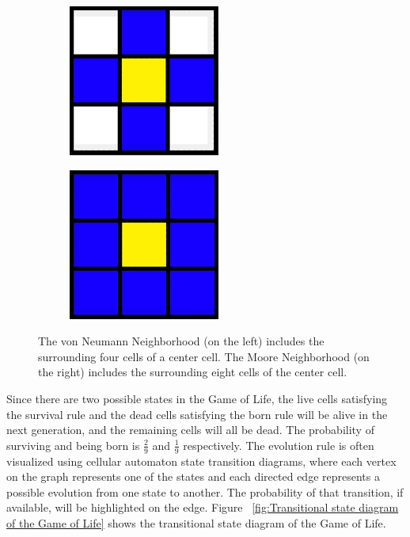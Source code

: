 \documentclass[12pt]{article}
\numberwithin{figure}{section} %
\begin{document}
\begin{figure}[H]
	\begin{subfigure}{0.48\textwidth}
     		\centering
     		\includegraphics[width=.6\linewidth]{Section1/1}
   	\end{subfigure}\hfill
   	\begin{subfigure}{0.48\textwidth}
     		\centering
     		\includegraphics[width=.6\linewidth]{Section1/2}
   	\end{subfigure}
   	\caption[Neighborhood configuration]{The von Neumann Neighborhood (on the left) includes the surrounding four cells of a center cell. The Moore Neighborhood (on the right) includes the surrounding eight cells of the center cell.}
   	\vspace{-1.5em}
   	\label{fig:Neighborhood configuration}
\end{figure}

Since there are two possible states in the Game of Life, the live cells satisfying the survival rule and the dead cells satisfying the born rule will be alive in the next generation, and the remaining cells will all be dead. The probability of surviving and being born is $\frac{2}{9}$ and $\frac{1}{9}$ respectively. The evolution rule is often visualized using cellular automaton state transition diagrams, where each vertex on the graph represents one of the states and each directed edge represents a possible evolution from one state to another. The probability of that transition, if available, will be highlighted on the edge. Figure ~\ref{fig:Transitional state diagram of the Game of Life} shows the transitional state diagram of the Game of Life. 
\end{document}
